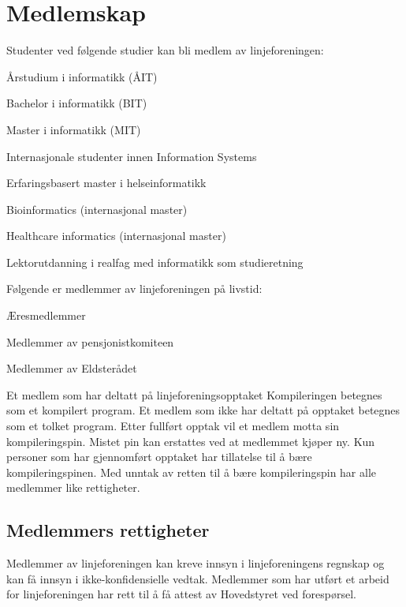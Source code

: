 \chapter{Medlemskap}
\label{chap:medlemskap}
Studenter ved følgende studier kan bli medlem av linjeforeningen: 
\begin{liste}
	\item Årstudium i informatikk (ÅIT)
	\item Bachelor i informatikk (BIT)
	\item Master i informatikk (MIT)
	\item Internasjonale studenter innen Information Systems
	\item Erfaringsbasert master i helseinformatikk		%
	\item Bioinformatics (internasjonal master)		%
	\item Healthcare informatics (internasjonal master)	%
	\item Lektorutdanning i realfag med informatikk som studieretning %
\end{liste} 
Følgende er medlemmer av linjeforeningen på livstid:
\begin{liste}
	\item Æresmedlemmer
	\item Medlemmer av pensjonistkomiteen
	\item Medlemmer av Eldsterådet
\end{liste}

Et medlem som har deltatt på linjeforeningsopptaket Kompileringen betegnes som et kompilert program. Et medlem som ikke har deltatt på opptaket betegnes som et tolket program. Etter fullført opptak vil et medlem motta sin kompileringspin. Mistet pin kan erstattes ved at medlemmet kjøper ny. Kun personer som har gjennomført opptaket har tillatelse til å bære kompileringspinen. Med unntak av retten til å bære kompileringspin har alle medlemmer like rettigheter. %

\section{Medlemmers rettigheter}

Medlemmer av linjeforeningen kan kreve innsyn i linjeforeningens regnskap og kan få innsyn i ikke-konfidensielle vedtak. Medlemmer som har utført et arbeid for linjeforeningen har rett til å få attest av Hovedstyret ved forespørsel.

